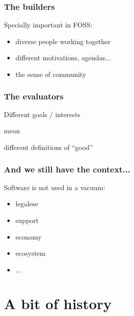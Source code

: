 \documentclass[17pt,aspectratio=169,hyperref=pdfusetitle]{beamer}
\begin{document}
\begin{frame}[fragile]
  \frametitle{The builders}

  Specially important in FOSS:

  \begin{itemize}
  \item diverse people working together
  \item different motivations, agendas...
  \item the sense of community
  \end{itemize}
    
\end{frame}

\begin{frame}[fragile]
  \frametitle{The evaluators}

  \begin{center}
  Different goals / interests

  mean

  different definitions of ``good''
  \end{center}
    
\end{frame}

\begin{frame}[fragile]
  \frametitle{And we still have the context...}

  Software is not used in a vacuum:

  \begin{itemize}
  \item legalese
  \item support
  \item economy
  \item ecosystem
  \item ...
  \end{itemize}
\end{frame}


\section{A bit of history}
\end{document}
